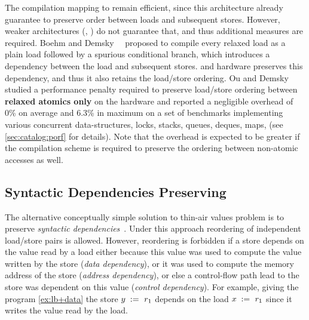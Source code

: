 The compilation mapping to \Intel remain efficient, 
since this architecture already guarantee to preserve order 
between loads and subsequent stores. 
However, weaker architectures (\ARM, \POWER) do not guarantee that, 
and thus additional measures are required.
Boehm and Demsky~\etal~\cite{Boehm-Demsky:MSPC14} proposed to 
compile every relaxed load as 
a plain load followed by a spurious conditional branch,
which introduces a dependency between 
the load and subsequent stores. 
\ARM and \POWER hardware preserves this dependency, 
and thus it also retains the load/store ordering. 
Ou and Demsky~\cite{Ou-Demsky:OOPSLA18} studied 
a performance penalty required to preserve
load/store ordering between \textbf{relaxed atomics only}
on the  hardware and reported a negligible overhead
of 0\% on average and 6.3\% in maximum on a set of benchmarks
implementing various concurrent data-structures, 
\eg locks, stacks, queues, deques, maps, \etc 
(see \ref{sec:catalog:porf} for details).
Note that the overhead is expected to be greater 
if the compilation scheme is required to preserve the ordering 
between non-atomic accesses as well. 


\subsection{Syntactic Dependencies Preserving}
\label{sec:analysis:deprf}

The alternative conceptually simple solution 
to thin-air values problem is to preserve 
\emph{syntactic dependencies}~\cite{Boehm-Demsky:MSPC14, Alglave-al:ASPLOS18}.
Under this approach reordering of independent load/store pairs is allowed.
However, reordering is forbidden if a store depends on the value 
read by a load either because this value 
was used to compute the value written by the store (\emph{data dependency}), 
or it was used to compute 
the memory address of the store (\emph{address dependency}),
or else a control-flow path lead to the store was dependent
on this value (\emph{control dependency}).
For example, giving the program \ref{ex:lb+data} 
the store $y\;:=_{}\;r_1$ depends 
on the load $x\;:=_{}\;r_1$ since 
it writes the value read by the load.

